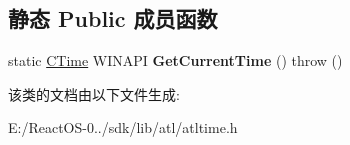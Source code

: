 \subsection*{静态 Public 成员函数}
\begin{DoxyCompactItemize}
\item 
\mbox{\label{class_a_t_l_1_1_c_time_acb5e38604d7203462c8a5720fdd01eae}} 
static \hyperlink{class_a_t_l_1_1_c_time}{C\+Time} W\+I\+N\+A\+PI {\bfseries Get\+Current\+Time} ()  throw ()
\end{DoxyCompactItemize}


该类的文档由以下文件生成\+:\begin{DoxyCompactItemize}
\item 
E\+:/\+React\+O\+S-\/0../sdk/lib/atl/atltime.\+h\end{DoxyCompactItemize}
